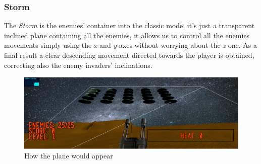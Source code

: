 \subsubsection{Storm}
The \textit{Storm} is the enemies' container into the classic mode, it's just a transparent inclined plane containing all the enemies, it allows us to control all the enemies movements simply using the \textit{x} and \textit{y} axes without worrying about the \textit{z} one. As a final result a clear descending movement directed towards the player is obtained, correcting also the enemy invaders' inclinations.
\begin{figure}[h!]
\begin{center}
\includegraphics[scale=0.3]{images/storm-plane.png}
\caption{How the plane would appear}
\end{center}
\end{figure}
\newpage
